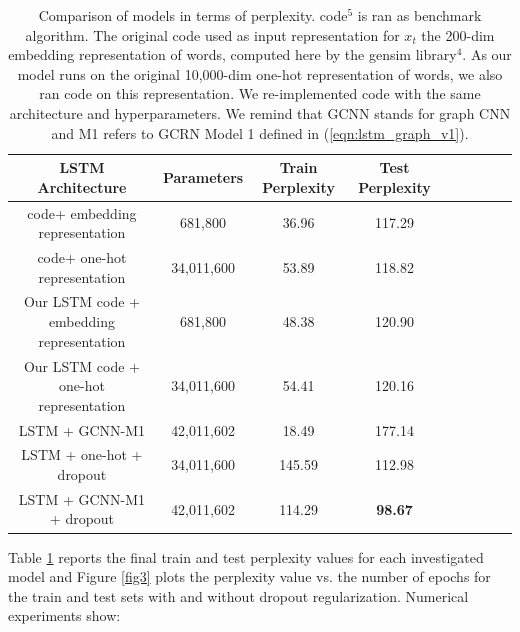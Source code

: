 \documentclass{article} %
\newcommand{\eqnref}[1]{(\ref{eqn:#1})}
\begin{document}
\begin{table}[t]
	\centering
	{\small
		\begin{tabular}{ccccccccc}
			\toprule
			LSTM Architecture & Parameters & Train Perplexity & Test Perplexity  \\
			\midrule
			\cite{zaremba2014recurrent} code\footnotemark[5] + embedding representation & 681,800 & 36.96 & 117.29 \\
			\cite{zaremba2014recurrent} code\footnotemark[5] + one-hot representation & 34,011,600 & 53.89 & 118.82 \\
			Our LSTM code + embedding representation & 681,800 & 48.38 & 120.90 \\
			Our LSTM code + one-hot representation & 34,011,600 & 54.41 & 120.16 \\
			LSTM + GCNN-M1 & 42,011,602 & 18.49 & 177.14 \\
			LSTM + one-hot + dropout  & 34,011,600 & 145.59 & 112.98 \\
			LSTM + GCNN-M1 + dropout & 42,011,602 & 114.29 & {\bf 98.67} \\
			\bottomrule
		\end{tabular}
	}
	\caption{Comparison of models in terms of perplexity. \cite{zaremba2014recurrent} code$^5$ is ran as benchmark algorithm. The original \cite{zaremba2014recurrent} code used as input representation for $x_t$ the 200-dim embedding representation of words, computed here by the gensim library$^4$. As our model runs on the original 10,000-dim one-hot representation of words, we also ran \cite{zaremba2014recurrent} code on this representation. We re-implemented \cite{zaremba2014recurrent} code with the same architecture and hyperparameters. We remind that GCNN stands for graph CNN and M1 refers to GCRN Model 1 defined in \eqnref{lstm_graph_v1}.} 
	\label{tab1}
\end{table}
\noindent
Table \ref{tab1} reports the final train and test perplexity values for each investigated model and Figure \ref{fig3} plots the perplexity value vs. the number of epochs for the train and test sets with and without dropout regularization. Numerical experiments show:
\vspace{-0.25cm}
\end{document}
